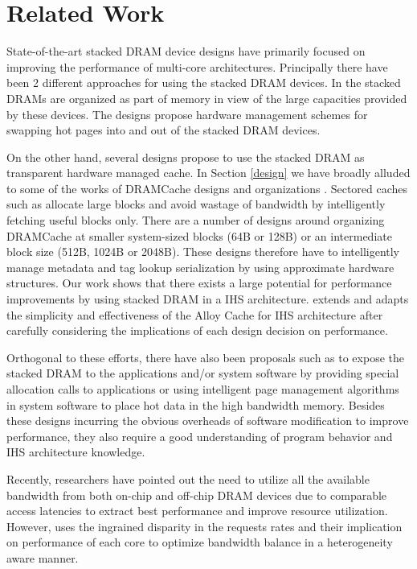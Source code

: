 \section{Related Work} \label{related-work}
State-of-the-art stacked DRAM device designs have primarily focused on improving the performance of multi-core architectures. Principally there have been 2 different approaches for using the stacked DRAM devices. In \cite{pom,cameo} the stacked DRAMs are organized as part of memory in view of the large capacities provided by these devices. The designs propose hardware management schemes for swapping hot pages into and out of the stacked DRAM devices.
\par On the other hand, several designs propose to use the stacked DRAM as transparent hardware managed cache. In Section \ref{design} we have broadly alluded to some of the works of DRAMCache designs and organizations \cite{alloy,atcache,bimodal,loh-hill}. Sectored caches such as \cite{footprint,unison-cache} allocate large blocks and avoid wastage of bandwidth by intelligently fetching useful blocks only. There are a number of designs around organizing DRAMCache at smaller system-sized blocks (64B or 128B) or an intermediate block size (512B, 1024B or 2048B). These designs therefore have to intelligently manage metadata and tag lookup serialization by using approximate hardware structures. Our work shows that there exists a large potential for performance improvements by using stacked DRAM in a IHS architecture. \cachename extends and adapts the simplicity and effectiveness of the Alloy Cache for IHS architecture after carefully considering the implications of each design decision on performance.
\par Orthogonal to these efforts, there have also been proposals such as \cite{software-dram} to expose the stacked DRAM to the applications and/or system software by providing special allocation calls to applications or using intelligent page management algorithms in system software to place hot data in the high bandwidth memory. Besides these designs incurring the obvious overheads of software modification to improve performance, they also require a good understanding of program behavior and IHS architecture knowledge.
\par Recently, researchers have pointed out the need to utilize all the available bandwidth from both on-chip and off-chip DRAM devices due to comparable access latencies \cite{mostly-clean,mainak-hpca,bear,micro-refresh} to extract best performance and improve resource utilization. However, \cachename uses the ingrained disparity in the requests rates and their implication on performance of each core to optimize bandwidth balance in a heterogeneity aware manner. 
